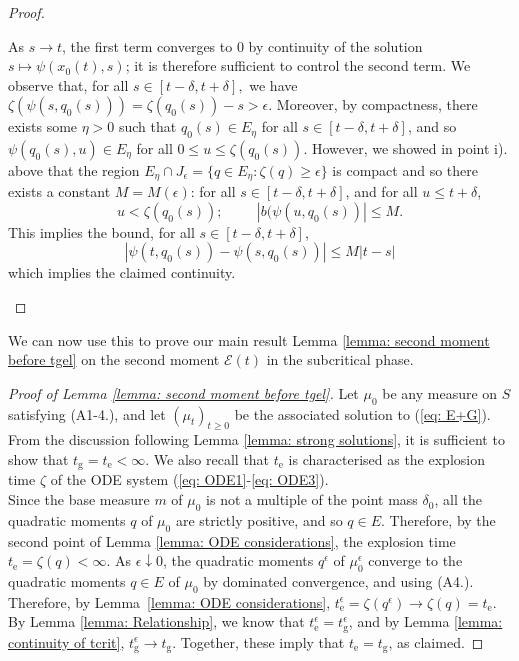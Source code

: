 \documentclass[11pt, notitlepage]{article}
\begin{document}
\begin{proof}
\begin{enumerate}[label=\roman{*}).]
\begin{equation}
\end{equation} As $s\rightarrow t$, the first term converges to $0$ by continuity of the solution $s\mapsto \psi(x_0(t),s)$; it is therefore sufficient to control the second term. We observe that, for all $s\in[t-\delta, t+\delta],$ we have $\zeta(\psi(s,q_0(s)))=\zeta(q_0(s))-s>\epsilon$. Moreover, by compactness, there exists some $\eta>0$ such that $q_0(s) \in E_\eta$ for all $s\in [t-\delta, t+\delta]$, and so $\psi(q_0(s),u)\in E_\eta$ for all $0\le u\le \zeta(q_0(s)).$ However, we showed in point i). above that the region $E_\eta \cap J_\epsilon=\{q \in E_\eta: \zeta(q)\geq\epsilon\}$ is compact  and so there exists a constant $M=M(\epsilon)$: for all $s\in[t-\delta, t+\delta]$, and for all $u \le t+\delta$, \begin{equation}u< \zeta(q_0(s));\hspace{1cm} |b(\psi(u,q_0(s))| \le M. \end{equation}
This implies the bound, for all $s\in[t-\delta,t+\delta]$, \begin{equation} |\psi(t,q_0(s))-\psi(s,q_0(s))| \le M|t-s|\end{equation} which implies the claimed continuity.
\end{enumerate}  \end{proof}



We can now use this to prove our main result Lemma \ref{lemma: second moment before tgel} on the second moment $\mathcal{E}(t)$ in the subcritical phase.





\begin{proof}[Proof of Lemma \ref{lemma: second moment before tgel}]
Let $\mu_0$ be any measure on $S$ satisfying ({A1}-{4}.), and let $(\mu_t)_{t\ge 0}$ be the associated solution to (\ref{eq: E+G}). From the discussion following Lemma \ref{lemma: strong solutions}, it is sufficient to show that $t_\mathrm{g}=t_\mathrm{e}<\infty$. We also recall that $t_\mathrm{e}$ is characterised as the explosion time $\zeta$ of the ODE system (\ref{eq: ODE1}-\ref{eq: ODE3}). \medskip \\ Since the base measure $m$ of $\mu_0$ is not a multiple of the point mass $\delta_0$, all the quadratic moments $q$ of $\mu_0$ are strictly positive, and so $q \in E$. Therefore, by the second point of Lemma \ref{lemma: ODE considerations}, the explosion time $t_\mathrm{e}=\zeta(q)<\infty.$
As $\epsilon \downarrow 0$, the quadratic moments $q^\epsilon$ of $\mu^\epsilon_0$ converge to the quadratic moments $q\in E$ of $\mu_0$ by dominated convergence, and using (A4.).  Therefore, by Lemma~\ref{lemma: ODE considerations},  $t^\epsilon_\mathrm{e}=\zeta(q^\epsilon)\rightarrow \zeta(q)= t_\mathrm{e}$.
By Lemma \ref{lemma: Relationship}, we know that $t_\mathrm{e}^\epsilon=t_\mathrm{g}^\epsilon$, and by Lemma \ref{lemma: continuity of tcrit}, $t_\mathrm{g}^\epsilon \rightarrow t_\mathrm{g}$. Together, these imply that $t_\mathrm{e} = t_\mathrm{g}$, as claimed.

\end{proof} 
\end{document}
